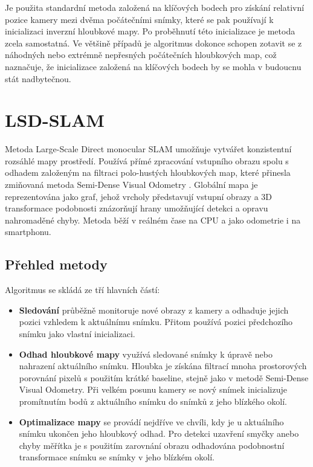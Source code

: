 \documentclass[12pt,a4paper]{report}
\begin{document}
Je použita standardní metoda založená na klíčových bodech pro získání relativní pozice kamery mezi dvěma počátečními snímky, které se pak používají k inicializaci inverzní hloubkové mapy. Po proběhnutí této inicializace je metoda zcela samostatná. Ve většině případů je algoritmus dokonce schopen zotavit se z náhodných nebo extrémně nepřesných počátečních hloubkových map, což naznačuje, že inicializace založená na klíčových bodech by se mohla v budoucnu stát nadbytečnou.

\section{LSD-SLAM}
Metoda Large-Scale Direct monocular SLAM umožňuje vytvářet konzistentní rozsáhlé mapy prostředí. Používá přímé zpracování vstupního obrazu spolu s odhadem založeným na filtraci polo-hustých hloubkových map, které přinesla zmiňovaná metoda Semi-Dense Visual Odometry \cite{Semi-Dense_VO}. Globální mapa je reprezentována jako graf, jehož vrcholy představují vstupní obrazy a 3D transformace podobnosti znázorňují hrany umožňující detekci a opravu nahromaděné chyby. Metoda běží v reálném čase na CPU a jako odometrie i na smartphonu.

\subsection*{Přehled metody}
Algoritmus se skládá ze tří hlavních částí:
\begin{itemize}
	\item \textbf{Sledování} průběžně monitoruje nové obrazy z kamery a odhaduje jejich pozici vzhledem k aktuálnímu snímku. Přitom používá pozici předchozího snímku jako vlastní inicializaci. 
	\item \textbf{Odhad hloubkové mapy} využívá sledované snímky k úpravě nebo nahrazení aktuálního snímku. Hloubka je získána filtrací mnoha prostorových porovnání pixelů s použitím krátké baseline, stejně jako v metodě Semi-Dense Visual Odometry. Při velkém posunu kamery se nový snímek inicializuje promítnutím bodů z aktuálního snímku do snímků z jeho blízkého okolí. 
	\item \textbf{Optimalizace mapy} se provádí nejdříve ve chvíli, kdy je u aktuálního snímku ukončen jeho hloubkový odhad. Pro detekci uzavření smyčky anebo chyby měřítka je s použitím zarovnání obrazu odhadována podobnostní transformace snímku se snímky v jeho blízkém okolí.
\end{itemize}
\end{document}
